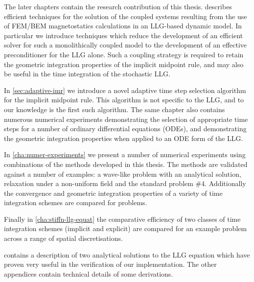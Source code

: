 The later chapters contain the research contribution of this thesis.
 describes efficient techniques for the solution of the coupled systems resulting from the use of FEM/BEM magnetostatics calculations in an LLG-based dynamic model.
In particular we introduce techniques which reduce the development of an efficient solver for such a monolithically coupled model to the development of an effective preconditioner for the LLG alone.
Such a coupling strategy is required to retain the geometric integration properties of the implicit midpoint rule, and may also be useful in the time integration of the stochastic LLG.

In \cref{sec:adaptive-imr} we introduce a novel adaptive time step selection algorithm for the implicit midpoint rule.
This algorithm is not specific to the LLG, and to our knowledge is the first such algorithm.
The same chapter also contains numerous numerical experiments demonstrating the selection of appropriate time steps for a number of ordinary differential equations (ODEs), and demonstrating the geometric integration properties when applied to an ODE form of the LLG.

In \cref{cha:numer-experiments} we present a number of numerical experiments using combinations of the methods developed in this thesis.
The methods are validated against a number of examples: a wave-like problem with an analytical solution, relaxation under a non-uniform field and the \mumag standard problem \#4.
Additionally the convergence and geometric integration properties of a variety of time integration schemes are compared for problems.

Finally in \cref{cha:stiffn-llg-equat} the comparative efficiency of two classes of time integration schemes (implicit and explicit) are compared for an example problem across a range of spatial discretisations.

 contains a description of two analytical solutions to the LLG equation which have proven very useful in the verification of our implementation.
The other appendices contain technical details of some derivations.


